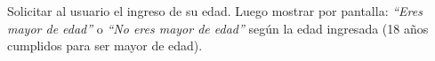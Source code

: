 Solicitar al usuario el ingreso de su edad. Luego mostrar por pantalla: \textit{``Eres mayor de edad''} o \textit{``No eres mayor de edad''} seg\'un la edad ingresada (18 a\~nos cumplidos para ser mayor de edad).



\volverindice
\newpage
